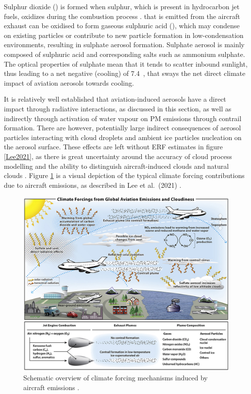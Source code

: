 Sulphur dioxide () is formed when sulphur, which is present in hydrocarbon jet fuels, oxidizes during the combustion process \cite{Brown1996}.  that is emitted from the aircraft exhaust can be oxidised to form gaseous sulphuric acid (), which may condense on existing particles or contribute to new particle formation in low-condensation environments, resulting in sulphate aerosol formation. Sulphate aerosol is mainly composed of sulphuric acid and corresponding salts such as ammonium sulphate. The optical properties of sulphate mean that it tends to scatter inbound sunlight, thus leading to a net negative (cooling) of 7.4~, that sways the net direct climate impact of aviation aerosols towards cooling. 

It is relatively well established that aviation-induced aerosols have a direct impact through radiative interactions, as discussed in this section, as well as indirectly through activation of water vapour on PM emissions through contrail formation. There are however, potentially large indirect consequences of aerosol particles interacting with cloud droplets and ambient ice particles nucleation on the aerosol surface. These effects are left without ERF estimates in figure \ref{Lee2021}, as there is great uncertainty around the accuracy of cloud process modelling and the ability to distinguish aircraft-induced clouds and natural clouds \cite{Penner2018}. Figure \ref{LeeClimateImpacts} is a visual depiction of the typical climate forcing contributions due to aircraft emissions, as described in Lee et al.\ (2021) \cite{Lee2021}.

\begin{figure}[H]
  \centering
  \includegraphics[width=0.55\linewidth]{LeeClimateImpacts.jpg}
  \caption{Schematic overview of climate forcing mechanisms induced by aircraft emissions \cite{Lee2021}.}
  \label{LeeClimateImpacts}
\end{figure}

